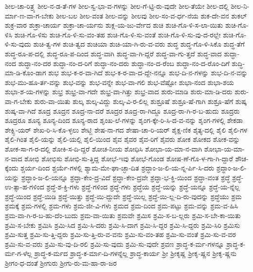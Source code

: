 {ಶೀಲ-ಚಾ-ರಿತ್ರ್ಯ
ಶೀಲ-ನ-ಡ-ತೆ-ಗಳ
ಶೀಲ-ಸ್ವ-ಭಾ-ವ-ಗಳನ್ನು
ಶೀಲ-ಗೆ-ಟ್ಟಿ-ರು-ವುದೇ
ಶೀಲ-ತೆಯೇ
ಶೀಲ-ದಲ್ಲಿ
ಶೀಲ-ನಿ-ರ್ಮಾ-ಣ-ವಾ-ಗ-ಬೇಕು
ಶೀಲ-ಬಲ
ಶೀಲ-ವಂತ
ಶೀಲ-ವನ್ನು
ಶೀಲವು
ಶೀಲ-ಸಂ-ವ-ರ್ಧ-ನೆಯ
ಶುಕ-ದೇ-ವನ
ಶುಕಲ್
ಶುಕ್ರ-ವಾರ
ಶುಕ್ರಾ-ಚಾರ್ಯ
ಶುಕ್ರಾ-ಚಾ-ರ್ಯನು
ಶುಕ್ಲ-ಯ-ಜು-ರ್ವೇದ
ಶುಚಿ
ಶುಚಿ-ಗೊ-ಳಿ-ಸ-ಲಾ-ಯಿತು
ಶುಚಿ-ಗೊ-ಳಿಸಿ
ಶುಚಿ-ಗೊ-ಳಿಸು
ಶುಚಿ-ಗೊ-ಳಿ-ಸು-ವಂ-ತಹ
ಶುಚಿ-ಗೊ-ಳಿ-ಸು-ವಂತೆ
ಶುಚಿ-ಗೊ-ಳಿ-ಸು-ವು-ದ-ರಲ್ಲೇ
ಶುಚಿ-ಗೊ-ಳಿ-ಸು-ವುದು
ಶುಚಿ-ತ್ವ-ಗಳ
ಶುಚಿ-ತ್ವದ
ಶುಚಿಯಾ
ಶುಚಿ-ಯಾ-ಗಿ-ರು-ವ-ವರು
ಶುದ್ಧ
ಶುದ್ಧ-ಗೊ-ಳಿ-ಸಿಕೊ
ಶುದ್ಧ-ತೆಗೆ
ಶುದ್ಧ-ರೂ-ಪ-ದಲ್ಲಿ
ಶುದ್ಧ-ರೂ-ಪ-ದಿಂದ
ಶುದ್ಧ-ವಾಗಿ
ಶುದ್ಧ-ವಾ-ಗಿ-ದ್ದರೆ
ಶುದ್ಧ-ವಾ-ಗು-ತ್ತದೆ
ಶುದ್ಧ-ವಾದ
ಶುದ್ಧಾ-ನಂದ
ಶುದ್ಧಾ-ನಂ-ದರ
ಶುದ್ಧಾ-ನಂ-ದ-ರಿಗೆ
ಶುದ್ಧಾ-ನಂ-ದರು
ಶುದ್ಧಾ-ನಂ-ದ-ರೆಂಬ
ಶುದ್ಧಾ-ನಂ-ದ-ರೊಂ-ದಿಗೆ
ಶುದ್ಧಿ-ಮಾ-ಡಿ-ಕೊಂ-ಡಾಗ
ಶುಭ
ಶುಭ-ಕ-ರ-ವಾ-ಗಿದೆ
ಶುಭ-ಕ-ರ-ವಾ-ದ-ದ್ದೇ-ನನ್ನೂ
ಶುಭ-ದಿ-ನ-ಗಳನ್ನು
ಶುಭ-ದಿ-ನ-ವನ್ನು
ಶುಭ-ಮು-ಹೂ-ರ್ತ-ವನ್ನು
ಶುಭ-ವನ್ನು
ಶುಭ-ವನ್ನೇ
ಶುಭ-ವಾ-ಗಲಿ
ಶುಭ-ವೆಷ್ಟೋ
ಶುಭಾ-ನಂದ
ಶುಭಾ-ಶಯ
ಶುಭಾ-ಶ-ಯ-ಗಳನ್ನು
ಶುಭ್ರ
ಶುಭ್ರ-ವಾ-ಗದೇ
ಶುಭ್ರ-ವಾ-ಗಿತ್ತು
ಶುಭ್ರ-ವಾದ
ಶುರು-ಮಾಡಿ
ಶುರು-ಮಾ-ಡಿ-ದರು
ಶುರು-ವಾ-ಗ-ಬೇಕು
ಶುರು-ವಾ-ಯಿತು
ಶುಲ್ಕ
ಶುಲ್ಕ-ವಿದ್ದು
ಶುಲ್ಕ-ವಿ-ರ-ಲಿಲ್ಲ
ಶುಶ್ರೂಷೆ
ಶುಶ್ರೂ-ಷೆ-ಗಾಗಿ
ಶುಶ್ರೂ-ಷೆಗೆ
ಶುಷ್ಕ
ಶುಷ್ಕ-ವಾ-ಗಿದೆ
ಶೂದ್ರ
ಶೂದ್ರನ
ಶೂದ್ರ-ನಾ-ದರೆ
ಶೂದ್ರರ
ಶೂದ್ರ-ರಾ-ಗಿದ್ದೂ
ಶೂದ್ರ-ರಾ-ಗಿ-ರ-ಬ-ಹುದು
ಶೂದ್ರರು
ಶೂದ್ರರೂ
ಶೂನ್ಯ
ಶೂನ್ಯ-ದಿಂದ
ಶೂನ್ಯ-ರಾದ
ಶೃಂಖ-ಲೆ-ಗಳನ್ನು
ಶೃಂಗ-ಕ್ಕೇ-ರಿ-ಸಿ-ದ-ವ-ನನ್ನು
ಶೃಂಗ-ಗಳಲ್ಲಿ
ಶೇಕಡಾ
ಶೇಕ್ಸ್ಪಿ-ಯರ್
ಶೇಖ-ರಿ-ಸಿ-ಕೊ-ಳ್ಳಲು
ಶೇಟ್ಜಿ
ಶೇಷ-ನಾ-ಗದ
ಶೇಷಾ-ಚಾ-ರಿ-ಯರ್
ಶೈಕ್ಷ-ಣಿಕ
ಶೈತ್ಯ-ದಲ್ಲಿ
ಶೈಲಿ
ಶೈಲಿ-ಗಳ
ಶೈಲಿ-ಗಿಂತ
ಶೈಲಿ-ಯನ್ನು
ಶೈಲಿ-ಯಲ್ಲಿ
ಶೈಲಿ-ಯಿಂದ
ಶೈವ
ಶೈವರ
ಶೈವ-ರಿಗೆ
ಶೈವರು
ಶೋಕ
ಶೋಕದ
ಶೋಕ-ವನ್ನು
ಶೋಕ-ಸಾ-ಗ-ರ-ದಲ್ಲಿ
ಶೋಕಿ-ಸ-ದಿ-ದ್ದರೆ
ಶೋಚ-ನೀಯ
ಶೋಧಿಸಿ
ಶೋಭಾ-ಯ-ಮಾ-ನ-ವಾಗಿ
ಶೋಭಾ-ಯ-ಮಾ-ನ-ವಾದ
ಶೋಭಿ
ಶೋಭಿಸು
ಶೋಭಿ-ಸು-ತ್ತಿದ್ದ
ಶೋಭೆ-ಇವು
ಶೋಭೆ-ಗೊಂಡ
ಶೋಷ-ಣೆ-ಗೊ-ಳ-ಗಾ-ಗಿ-ದ್ದಾರೆ
ಶೌಚ-ಕ್ಕೆಂದು
ಶ್ಚರ್ಯ-ದಿಂದ
ಶ್ಚರ್ಯೆ-ಗಳಲ್ಲಿ
ಶ್ಯಾಮ-ಮೇ-ಘಾ-ಚ್ಛಾ-ದಿತ
ಶ್ರದ್ಧಾಂ-ಜ-ಲಿ-ಯ-ನ್ನ-ರ್ಪಿ-ಸಿ-ದರು
ಶ್ರದ್ಧಾಂ-ಜ-ಲಿ-ಯನ್ನು
ಶ್ರದ್ಧಾಂ-ಜ-ಲಿ-ಯನ್ನೂ
ಶ್ರದ್ಧಾ-ಕೇಂ-ದ್ರ-ವಿದೆ
ಶ್ರದ್ಧಾ-ಕೇಂ-ದ್ರವೇ
ಶ್ರದ್ಧಾ-ಭ-ಕ್ತಿ-ಯಿಂದ
ಶ್ರದ್ಧಾ-ವಂತ
ಶ್ರದ್ಧೆ
ಶ್ರದ್ಧೆ-ಉ-ತ್ಸಾ-ಹ-ಗಳಿಂದ
ಶ್ರದ್ಧೆ-ಶ-ಕ್ತಿ-ಗಳು
ಶ್ರದ್ಧೆ-ಗಳಿಂದ
ಶ್ರದ್ಧೆ-ಗಳು
ಶ್ರದ್ಧೆಯ
ಶ್ರದ್ಧೆ-ಯನ್ನು
ಶ್ರದ್ಧೆ-ಯನ್ನೂ
ಶ್ರದ್ಧೆ-ಯ-ನ್ನೆಲ್ಲ
ಶ್ರದ್ಧೆ-ಯಿಂದ
ಶ್ರದ್ಧೆ-ಯಿಡಿ
ಶ್ರದ್ಧೆ-ಯಿತ್ತು
ಶ್ರದ್ಧೆ-ಯಿ-ದ್ದುದೇ
ಶ್ರದ್ಧೆ-ಯಿಲ್ಲ
ಶ್ರದ್ಧೆ-ಯಿ-ಲ್ಲ-ದಿ-ರು-ವುದನ್ನು
ಶ್ರದ್ಧೆಯು
ಶ್ರಮ
ಶ್ರಮಕ್ಕೆ
ಶ್ರಮ-ಗಳಲ್ಲಿ
ಶ್ರಮ-ಗಳು
ಶ್ರಮ-ಜೀ-ವಿ-ಗಳು
ಶ್ರಮದ
ಶ್ರಮ-ದಿಂದ
ಶ್ರಮ-ಪಟ್ಟು
ಶ್ರಮ-ವನ್ನು
ಶ್ರಮ-ವ-ಹಿಸಿ
ಶ್ರಮ-ವಾ-ಗಿ-ರ-ಬ-ಹು-ದೆಂ-ಬುದು
ಶ್ರಮ-ವಾ-ಯಿತು
ಶ್ರಮವೇ
ಶ್ರಮಿಸ
ಶ್ರಮಿ-ಸ-ಬ-ಲ್ಲರು
ಶ್ರಮಿ-ಸ-ಬೇ-ಕಾ-ಯಿತು
ಶ್ರಮಿ-ಸ-ಬೇಕು
ಶ್ರಮಿಸಿ
ಶ್ರಮಿ-ಸಿದ
ಶ್ರಮಿ-ಸಿ-ದರು
ಶ್ರಮಿ-ಸಿ-ದಾಗ
ಶ್ರಮಿ-ಸಿ-ದ್ದರ
ಶ್ರಮಿ-ಸಿ-ದ್ದರು
ಶ್ರಮಿ-ಸಿರಿ
ಶ್ರಮಿಸು
ಶ್ರಮಿ-ಸುತ್ತ
ಶ್ರಮಿ-ಸು-ತ್ತಿ-ದ್ದರು
ಶ್ರಮಿ-ಸು-ತ್ತಿ-ರು-ವ-ವನು
ಶ್ರಮಿ-ಸು-ವಂ-ತಹ
ಶ್ರಮಿ-ಸು-ವಂತೆ
ಶ್ರಮಿ-ಸು-ವ-ವರ
ಶ್ರಮಿ-ಸು-ವ-ವರು
ಶ್ರಮಿ-ಸು-ವು-ದಿ-ರಲಿ
ಶ್ರಮಿ-ಸು-ವುದು
ಶ್ರಮಿ-ಸು-ವುದೇ
ಶ್ರವಣ
ಶ್ರಾದ್ಧ-ಕ-ರ್ಮ-ಗಳನ್ನೂ
ಶ್ರಾದ್ಧ-ಕ-ರ್ಮ-ಗ-ಳೆಲ್ಲ
ಶ್ರಾದ್ಧ-ಕ-ರ್ಮದ
ಶ್ರಾದ್ಧ-ಕ-ರ್ಮಾ-ದಿ-ಗಳನ್ನೆಲ್ಲ
ಶ್ರಾದ್ಧ-ಕಾರ್ಯ
ಶ್ರೀ
ಶ್ರೀಕೃಷ್ಣ
ಶ್ರೀಕೃ-ಷ್ಣನ
ಶ್ರೀಕೃ-ಷ್ಣನು
ಶ್ರೀಗಂ-ಧ-ದಂತೆ
ಶ್ರೀಗುರು
ಶ್ರೀಗು-ರು-ಮ-ಹಾ-ರಾ-ಜರ
}
